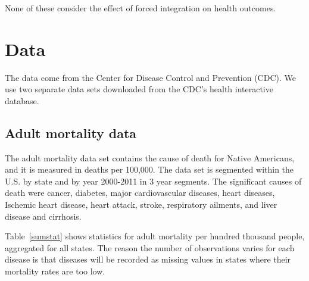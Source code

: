 \documentclass[12pt]{article}
\begin{document}
None of these consider the effect of forced integration on health outcomes.

\section{Data}
The data come from the Center for Disease Control and Prevention (CDC). We use two separate data sets downloaded from the CDC's health interactive database.

\subsection{Adult mortality data}
The adult mortality data set contains the cause of death for Native Americans, and it is measured in deaths per 100,000.
The data set is segmented within the U.S. by state and by year 2000-2011 in 3 year segments.
The significant causes of death were cancer, diabetes, major cardiovascular diseases, heart diseases, Ischemic heart disease, heart attack, stroke, respiratory ailments, and liver disease and cirrhosis.

Table~\ref{sumstat} shows statistics for adult mortality per hundred thousand people, aggregated for all states.
The reason the number of observations varies for each disease is that diseases will be recorded as missing values in states where their mortality rates are too low.
\end{document}
